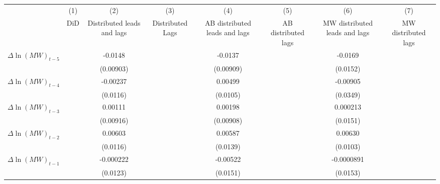 {
\def\sym#1{\ifmmode^{#1}\else\(^{#1}\)\fi}
\begin{tabular}{l*{7}{c}}
\hline\hline
          &\multicolumn{1}{c}{(1)}&\multicolumn{1}{c}{(2)}&\multicolumn{1}{c}{(3)}&\multicolumn{1}{c}{(4)}&\multicolumn{1}{c}{(5)}&\multicolumn{1}{c}{(6)}&\multicolumn{1}{c}{(7)}\\
          &\multicolumn{1}{c}{DiD}&\multicolumn{1}{c}{Distributed leads and lags}&\multicolumn{1}{c}{Distributed Lags}&\multicolumn{1}{c}{AB distributed leads and lags}&\multicolumn{1}{c}{AB distributed lags}&\multicolumn{1}{c}{MW distributed leads and lags}&\multicolumn{1}{c}{MW distributed lags}\\
\hline
$\Delta \ln(MW)_{t-5}$&                  &  -0.0148         &                  &  -0.0137         &                  &  -0.0169         &                  \\
          &                  &(0.00903)         &                  &(0.00909)         &                  & (0.0152)         &                  \\
[1em]
$\Delta \ln(MW)_{t-4}$&                  & -0.00237         &                  &  0.00499         &                  & -0.00905         &                  \\
          &                  & (0.0116)         &                  & (0.0105)         &                  & (0.0349)         &                  \\
[1em]
$\Delta \ln(MW)_{t-3}$&                  &  0.00111         &                  &  0.00198         &                  & 0.000213         &                  \\
          &                  &(0.00916)         &                  &(0.00908)         &                  & (0.0151)         &                  \\
[1em]
$\Delta \ln(MW)_{t-2}$&                  &  0.00603         &                  &  0.00587         &                  &  0.00630         &                  \\
          &                  & (0.0116)         &                  & (0.0139)         &                  & (0.0103)         &                  \\
[1em]
$\Delta \ln(MW)_{t-1}$&                  &-0.000222         &                  & -0.00522         &                  &-0.0000891         &                  \\
          &                  & (0.0123)         &                  & (0.0151)         &                  & (0.0153)         &                  \\

\end{tabular}}
